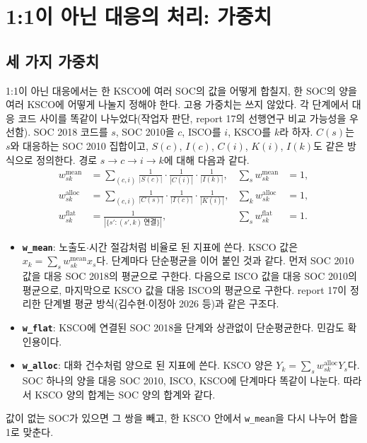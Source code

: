 \documentclass[11pt]{article}
\begin{document}
\section{1:1이 아닌 대응의 처리: 가중치}

\subsection{세 가지 가중치}

1:1이 아닌 대응에서는 한 KSCO에 여러 SOC의 값을 어떻게 합칠지, 한 SOC의 양을 여러 KSCO에 어떻게 나눌지 정해야 한다. 고용 가중치는 쓰지 않았다. 각 단계에서 대응 코드 사이를 똑같이 나누었다(작업자 판단, report 17의 선행연구 비교 가능성을 우선함). SOC 2018 코드를 $s$, SOC 2010을 $c$, ISCO를 $i$, KSCO를 $k$라 하자. $C(s)$는 $s$와 대응하는 SOC 2010 집합이고, $S(c)$, $I(c)$, $C(i)$, $K(i)$, $I(k)$도 같은 방식으로 정의한다. 경로 $s \to c \to i \to k$에 대해 다음과 같다.
\begin{align}
  w^{\text{mean}}_{sk} &= \sum_{(c,i)} \frac{1}{|S(c)|}\cdot\frac{1}{|C(i)|}\cdot\frac{1}{|I(k)|}, & \sum_s w^{\text{mean}}_{sk} &= 1, \\
  w^{\text{alloc}}_{sk} &= \sum_{(c,i)} \frac{1}{|C(s)|}\cdot\frac{1}{|I(c)|}\cdot\frac{1}{|K(i)|}, & \sum_k w^{\text{alloc}}_{sk} &= 1, \\
  w^{\text{flat}}_{sk} &= \frac{1}{|\{s' : (s',k)\ \text{연결}\}|}, & \sum_s w^{\text{flat}}_{sk} &= 1.
\end{align}
\begin{itemize}[leftmargin=*]
  \item \textbf{\texttt{w\_mean}}: 노출도$\cdot$시간 절감처럼 비율로 된 지표에 쓴다. KSCO 값은 $x_k = \sum_s w^{\text{mean}}_{sk} x_s$다. 단계마다 단순평균을 이어 붙인 것과 같다. 먼저 SOC 2010 값을 대응 SOC 2018의 평균으로 구한다. 다음으로 ISCO 값을 대응 SOC 2010의 평균으로, 마지막으로 KSCO 값을 대응 ISCO의 평균으로 구한다. report 17이 정리한 단계별 평균 방식(김수현$\cdot$이정아 2026 등)과 같은 구조다.
  \item \textbf{\texttt{w\_flat}}: KSCO에 연결된 SOC 2018을 단계와 상관없이 단순평균한다. 민감도 확인용이다.
  \item \textbf{\texttt{w\_alloc}}: 대화 건수처럼 양으로 된 지표에 쓴다. KSCO 양은 $Y_k = \sum_s w^{\text{alloc}}_{sk} Y_s$다. SOC 하나의 양을 대응 SOC 2010, ISCO, KSCO에 단계마다 똑같이 나눈다. 따라서 KSCO 양의 합계는 SOC 양의 합계와 같다.
\end{itemize}
값이 없는 SOC가 있으면 그 쌍을 빼고, 한 KSCO 안에서 \texttt{w\_mean}을 다시 나누어 합을 1로 맞춘다.
\end{document}
